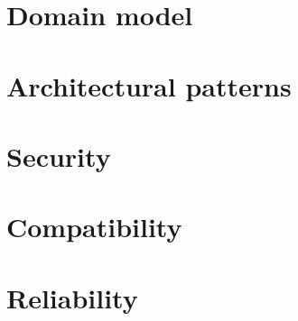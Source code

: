 \section{Domain model}
\label{sec:domain_model}


\section{Architectural patterns}
\label{sec:patterns}


\section{Security}
\label{csec:security}


\section{Compatibility}
\label{sec:compatibility}


\section{Reliability}
\label{sec:reliability}
